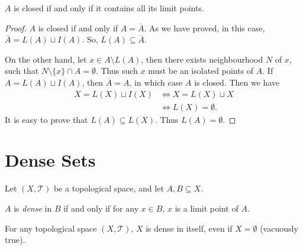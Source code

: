 \begin{proposition}
	$A$ is closed if and only if it contains all its limit points.
	
	\begin{proof}
		$A$ is closed if and only if $A = \overline A$. As we have proved, in this case, $\overline A = L(A) \sqcup I(A)$. So, $L(A) \subseteq \overline A$.
		
		On the other hand, let $x \in A \setminus L(A)$, then there exists neighbourhood $N$ of $x$, such that $N \setminus \{x\} \cap A = \emptyset$. Thus such $x$ must be an isolated points of $A$. If $A = L(A) \sqcup I(A)$, then $\overline A = A$, in which case $A$ is closed. Then we have
		$$
		\begin{aligned}
			X = L(X) \sqcup I(X) & \iff X = L(X) \sqcup X \\
			&\iff L(X) = \emptyset.
		\end{aligned}
		$$
		It is easy to prove that $L(A) \subseteq L(X)$. Thus $L(A) = \emptyset$.
	\end{proof}
\end{proposition}


\section{Dense Sets}


Let $(X, \mathcal T)$ be a topological space, and let $A, B \subseteq X$.


\begin{definition}
	$A$ is \textit{dense} in $B$ if and only if for any $x \in B$, $x$ is a limit point of $A$.
\end{definition}


\begin{example}
	For any topological space $(X, \mathcal T)$, $X$ is dense in itself, even if $X = \emptyset$ (vacuously true).
\end{example}


